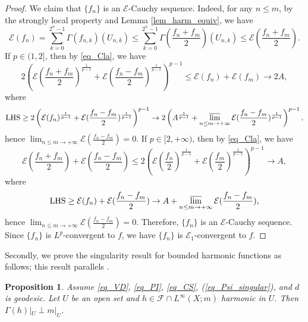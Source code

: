 \documentclass[11pt,a4paper]{article}
\numberwithin{equation}{section}
\theoremstyle{plain}
\newtheorem{proposition}[theorem]{Proposition}
\theoremstyle{definition}
\begin{document}
\begin{proof}
We claim that $\{f_n\}$ is an $\mathcal{E}$-Cauchy sequence. Indeed, for any $n\le m$, by the strongly local property and Lemma \ref{lem_harm_equiv}, we have
$$\mathcal{E}(f_n)=\sum_{k=0}^{2^n-1}\Gamma(f_{n,k})(U_{n,k})\le\sum_{k=0}^{2^n-1}\Gamma(\frac{f_n+f_m}{2})(U_{n,k})\le\mathcal{E}(\frac{f_n+f_m}{2}).$$
If $p\in(1,2]$, then by \ref{eq_Cla}, we have
$$2 \left(\mathcal{E}(\frac{f_n+f_m}{2})^{\frac{1}{p-1}}+\mathcal{E}(\frac{f_n-f_m}{2})^{\frac{1}{p-1}}\right)^{p-1}\le\mathcal{E}(f_n)+\mathcal{E}(f_m)\to 2A,$$
where
$$\text{LHS}\ge 2 \left(\mathcal{E}(f_n)^{\frac{1}{p-1}}+\mathcal{E}(\frac{f_n-f_m}{2})^{\frac{1}{p-1}}\right)^{p-1}\to2 \left(A^{\frac{1}{p-1}}+\varlimsup_{n\le m\to+\infty}\mathcal{E}(\frac{f_n-f_m}{2})^{\frac{1}{p-1}}\right)^{p-1},$$
hence $\lim_{n\le m\to+\infty}\mathcal{E}(\frac{f_n-f_m}{2})=0$. If $p\in[2,+\infty)$, then by \ref{eq_Cla}, we have
$$\mathcal{E}(\frac{f_n+f_m}{2})+\mathcal{E}(\frac{f_n-f_m}{2})\le2 \left(\mathcal{E}(\frac{f_n}{2})^{\frac{1}{p-1}}+\mathcal{E}(\frac{f_m}{2})^{\frac{1}{p-1}}\right)^{p-1}\to A,$$
where
$$\text{LHS}\ge\mathcal{E}(f_n)+\mathcal{E}(\frac{f_n-f_m}{2})\to A+\varlimsup_{n\le m\to+\infty}\mathcal{E}(\frac{f_n-f_m}{2}),$$
hence $\lim_{n\le m\to+\infty}\mathcal{E}(\frac{f_n-f_m}{2})=0$. Therefore, $\{f_n\}$ is an $\mathcal{E}$-Cauchy sequence. Since $\{f_n\}$ is $L^p$-convergent to $f$, we have $\{f_n\}$ is $\mathcal{E}_1$-convergent to $f$.
\end{proof}

Secondly, we prove the singularity result for bounded harmonic functions as follows; this result parallels \cite[PROPOSITION 3.5]{KM20}.

\begin{proposition}\label{prop_har_singular}
Assume \ref{eq_VD}, \ref{eq_PI}, \ref{eq_CS}, (\ref{eq_Psi_singular}), and $d$ is geodesic. Let $U$ be an open set and $h\in\mathcal{F}\cap L^\infty(X;m)$ harmonic in $U$. Then $\Gamma(h)|_U\perp m|_U$.
\end{proposition}
\end{document}
